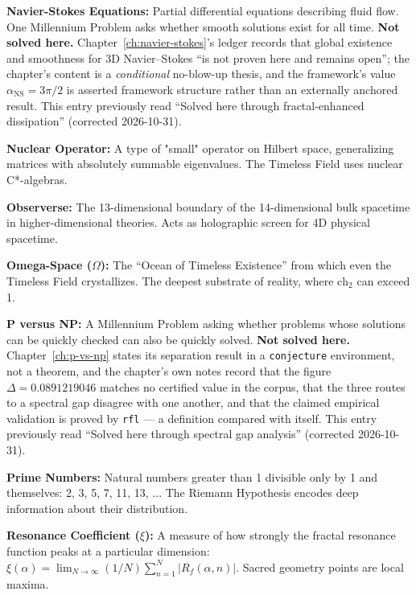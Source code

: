 \noindent\textbf{Navier-Stokes Equations:} Partial differential equations describing fluid flow. One Millennium Problem asks whether smooth solutions exist for all time. \textbf{Not solved
here.} Chapter~\ref{ch:navier-stokes}'s ledger records that global existence and
smoothness for 3D Navier--Stokes ``is not proven here and remains open''; the
chapter's content is a \emph{conditional} no-blow-up thesis, and the framework's
value $\alpha_{\text{NS}} = 3\pi/2$ is asserted framework structure rather than
an externally anchored result. This entry previously read ``Solved here through
fractal-enhanced dissipation'' (corrected 2026-10-31).

\noindent\textbf{Nuclear Operator:} A type of "small" operator on Hilbert space, generalizing matrices with absolutely summable eigenvalues. The Timeless Field uses nuclear C*-algebras.

\noindent\textbf{Observerse:} The 13-dimensional boundary of the 14-dimensional bulk spacetime in higher-dimensional theories. Acts as holographic screen for 4D physical spacetime.

\noindent\textbf{Omega-Space ($\Omega$):} The ``Ocean of Timeless Existence'' from which even the Timeless Field crystallizes. The deepest substrate of reality, where $\text{ch}_2$ can exceed 1.

\noindent\textbf{P versus NP:} A Millennium Problem asking whether problems whose solutions can be quickly checked can also be quickly solved. \textbf{Not solved here.}
Chapter~\ref{ch:p-vs-np} states its separation result in a \texttt{conjecture}
environment, not a theorem, and the chapter's own notes record that the figure
$\Delta = 0.0891219046$ matches no certified value in the corpus, that the three
routes to a spectral gap disagree with one another, and that the claimed
empirical validation is proved by \texttt{rfl} --- a definition compared with
itself. This entry previously read ``Solved here through spectral gap analysis''
(corrected 2026-10-31).

\noindent\textbf{Prime Numbers:} Natural numbers greater than 1 divisible only by 1 and themselves: 2, 3, 5, 7, 11, 13, ... The Riemann Hypothesis encodes deep information about their distribution.

\noindent\textbf{Resonance Coefficient ($\xi$):} A measure of how strongly the fractal resonance function peaks at a particular dimension: $\xi(\alpha) = \lim_{N \to \infty} (1/N)\sum_{n=1}^{N} |R_f(\alpha, n)|$. Sacred geometry points are local maxima.

